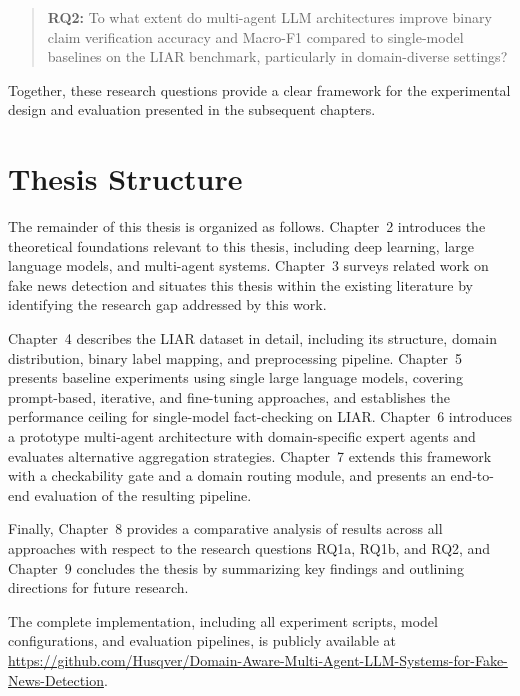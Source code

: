\begin{quote}
\textbf{RQ2:} To what extent do multi-agent LLM architectures improve binary claim verification accuracy and Macro-F1 compared to single-model baselines on the LIAR benchmark, particularly in domain-diverse settings?
\end{quote}

Together, these research questions provide a clear framework for the experimental design and evaluation presented in the subsequent chapters.

\section{Thesis Structure}

The remainder of this thesis is organized as follows. Chapter~2 introduces the theoretical foundations relevant to this thesis, 
including deep learning, large language models, and multi-agent systems. Chapter~3 surveys related work on fake news detection and 
situates this thesis within the existing literature by identifying the research gap addressed by this work.

Chapter~4 describes the LIAR dataset in detail, including its structure, domain distribution, binary label mapping, and 
preprocessing pipeline. Chapter~5 presents baseline experiments using single large language models, covering prompt-based, 
iterative, and fine-tuning approaches, and establishes the performance ceiling for single-model fact-checking on LIAR. Chapter~6 introduces a prototype multi-agent architecture with domain-specific expert agents and evaluates alternative aggregation 
strategies. Chapter~7 extends this framework with a checkability gate and a domain routing module, and presents an end-to-end   evaluation of the resulting pipeline.

Finally, Chapter~8 provides a comparative analysis of results across all approaches with respect to the research questions 
RQ1a, RQ1b, and RQ2, and Chapter~9 concludes the thesis by summarizing key findings and outlining directions for future 
research.

The complete implementation, including all experiment scripts, model configurations, and evaluation pipelines, is publicly available at \url{https://github.com/Husqver/Domain-Aware-Multi-Agent-LLM-Systems-for-Fake-News-Detection}.